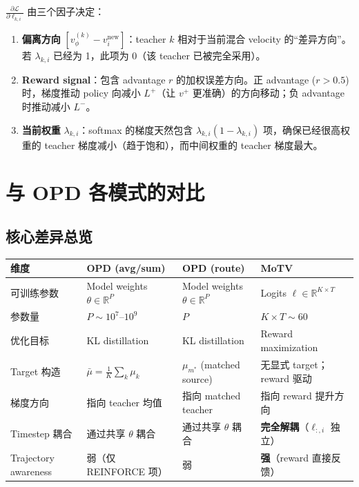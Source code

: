 \documentclass[11pt,a4paper]{article}
\newcommand{\loss}{\mathcal{L}}
\newcommand{\R}{\mathbb{R}}
\newcommand{\vphi}{v_\phi}
\theoremstyle{definition}
\begin{document}
\begin{tcolorbox}[colback=blue!5, colframe=blue!40, title=MoTV 梯度的物理含义]
$\frac{\partial \loss}{\partial \ell_{k,i}}$ 由三个因子决定：

\begin{enumerate}[leftmargin=1.5em]
\item \textbf{偏离方向} $[\vphi^{(k)} - v^{\mathrm{new}}_i]$：teacher $k$ 相对于当前混合 velocity 的``差异方向''。若 $\lambda_{k,i}$ 已经为 1，此项为 0（该 teacher 已被完全采用）。

\item \textbf{Reward signal}：包含 advantage $r$ 的加权误差方向。正 advantage ($r > 0.5$) 时，梯度推动 policy 向减小 $L^+$（让 $v^+$ 更准确）的方向移动；负 advantage 时推动减小 $L^-$。

\item \textbf{当前权重} $\lambda_{k,i}$：softmax 的梯度天然包含 $\lambda_{k,i}(1-\lambda_{k,i})$ 项，确保已经很高权重的 teacher 梯度减小（趋于饱和），而中间权重的 teacher 梯度最大。
\end{enumerate}
\end{tcolorbox}

\section{与 OPD 各模式的对比}
\label{sec:comparison}

\subsection{核心差异总览}

\begin{center}
\renewcommand{\arraystretch}{1.6}
\begin{tabular}{@{}p{2.5cm} p{3.5cm} p{3.5cm} p{4cm}@{}}
\toprule
\textbf{维度} & \textbf{OPD (avg/sum)} & \textbf{OPD (route)} & \textbf{MoTV} \\
\midrule
可训练参数 & Model weights $\theta \in \R^P$ & Model weights $\theta \in \R^P$ & Logits $\ell \in \R^{K \times T}$ \\
参数量 & $P \sim 10^7$--$10^9$ & $P$ & $K \times T \sim 60$ \\
优化目标 & KL distillation & KL distillation & Reward maximization \\
Target 构造 & $\bar{\mu} = \frac{1}{K}\sum_k \mu_k$ & $\mu_{m^*}$ (matched source) & 无显式 target；reward 驱动 \\
梯度方向 & 指向 teacher 均值 & 指向 matched teacher & 指向 reward 提升方向 \\
Timestep 耦合 & 通过共享 $\theta$ 耦合 & 通过共享 $\theta$ 耦合 & \textbf{完全解耦}（$\ell_{:,i}$ 独立） \\
Trajectory awareness & 弱（仅 REINFORCE 项） & 弱 & \textbf{强}（reward 直接反馈） \\
\bottomrule
\end{tabular}
\end{center}
\end{document}
